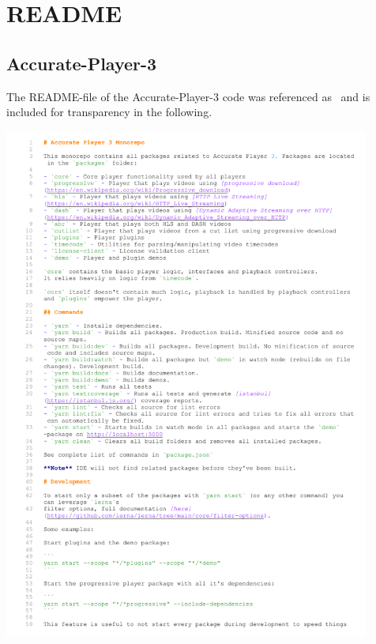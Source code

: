 \documentclass[../MasterThesis.tex]{subfiles}
\begin{document}
	
	
\newpage

\section{README} \label{appendix:readme}


\subsection{Accurate-Player-3} \label{appendix:readmeaccurateplayer}

The README-file of the Accurate-Player-3 code was referenced as~\cite{RM_Frontend} and is included for transparency in the following.

\includegraphics[page=1, width=0.9\textwidth]{FE.pdf}
\end{document}

